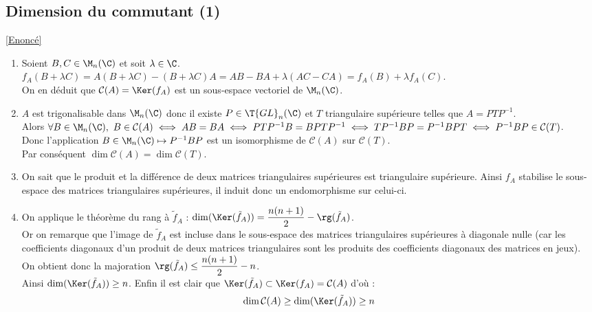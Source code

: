 \documentclass[8pt]{book}
\begin{document}
	\subsection{Dimension du commutant (1) }
	\label{Dimension du commutant (1) corrigé}
	\textcolor{blue}{\hyperref[Dimension du commutant (1)]{[Enoncé]}}\\
	\begin{enumerate}[leftmargin=*]
		\item Soient $B,C\in \M_n(\C)$ et soit $\lambda\in \C$.\\
		$f_A(B+\lambda C)=A(B+\lambda C)-(B+\lambda C)A=AB-BA+\lambda(AC-CA)=f_A(B)+\lambda f_A(C)$.\\
		On en déduit que $\mathcal C(A)=\Ker(f_A)$ est un sous-espace vectoriel de $\M_n(\C)$.
		\item $A$ est trigonalisable dans $\M_n(\C)$ donc il existe $P\in \T{GL}_n(\C)$ et $T$ triangulaire supérieure telles que $A=PTP^{-1}$.\\
		Alors $\forall B\in \M_n(\C),\ B\in \mathcal C(A)\iff AB=BA\iff PTP^{-1}B=BPTP^{-1}\iff TP^{-1}BP=P^{-1}BPT\iff P^{-1}BP\in \mathcal C(T)$.\\
		Donc l'application $B\in \M_n(\C)\mapsto P^{-1}BP$ est un isomorphisme de $\mathcal C(A)$ sur $\mathcal C(T)$.\\
		Par conséquent $\dim\mathcal C(A)=\dim\mathcal C(T)$.
		\item On sait que le produit et la différence de deux matrices triangulaires supérieures est triangulaire supérieure. Ainsi $f_A$ stabilise le sous-espace des matrices triangulaires supérieures, il induit donc un endomorphisme sur celui-ci.
		\item On applique le théorème du rang à $\tilde f_A$ : $\dim(\Ker(\tilde f_A))=\dfrac{n(n+1)}{2}-\rg(\tilde f_A)$.\\
		Or on remarque que l'image de $\tilde f_A$ est incluse dans le sous-espace des matrices triangulaires supérieures à diagonale nulle (car les coefficients diagonaux d'un produit de deux matrices triangulaires sont les produits des coefficients diagonaux des matrices en jeux).\\
		On obtient donc la majoration $\rg(\tilde f_A)\leq \dfrac{n(n+1)}{2}-n$.\\
		Ainsi $\dim(\Ker(\tilde f_A))\geq n$. Enfin il est clair que $\Ker(\tilde f_A)\subset \Ker(f_A)=\mathcal C(A)$ d'où :
		$$\dim\mathcal C(A)\geq \dim(\Ker(\tilde f_A))\geq n$$
	\end{enumerate}
	
\end{document}
